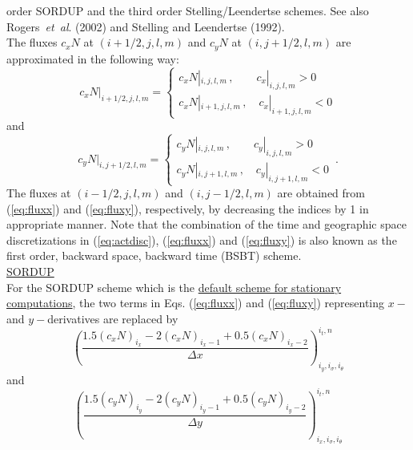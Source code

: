 \documentclass[12pt]{book}
\begin{document}
order SORDUP and the third order Stelling/Leendertse schemes.
See also Rogers~{\it et~al}. (2002) and Stelling and Leendertse (1992).
\\[2ex]
\noindent
The fluxes $c_x N$ at $(i+1/2,j,l,m)$ and $c_y N$ at $(i,j+1/2,l,m)$ are approximated in the
following way:
\begin{equation}
  c_x N|_{i+1/2,j,l,m} = \left\{
                           \begin{array}{l}
                              c_x N|_{i,j,l,m}\,, \qquad c_x|_{i,j,l,m} > 0 \\
                              c_x N|_{i+1,j,l,m}\,, \quad c_x|_{i+1,j,l,m} < 0
                           \end{array}
                         \right.
  \label{eq:fluxx}
\end{equation}
and
\begin{equation}
  c_y N|_{i,j+1/2,l,m} = \left\{
                           \begin{array}{l}
                              c_y N|_{i,j,l,m}\,, \qquad c_y|_{i,j,l,m} > 0 \\
                              c_y N|_{i,j+1,l,m}\,, \quad c_y|_{i,j+1,l,m} < 0
                           \end{array}
                         \right.\, .
  \label{eq:fluxy}
\end{equation}
The fluxes at $(i-1/2,j,l,m)$ and $(i,j-1/2,l,m)$ are obtained from (\ref{eq:fluxx}) and (\ref{eq:fluxy}),
respectively, by decreasing the indices by 1 in appropriate manner. Note that the combination of the time
and geographic space discretizations in (\ref{eq:actdisc}), (\ref{eq:fluxx}) and (\ref{eq:fluxy}) is also
known as the first order, backward space, backward time (BSBT) scheme.
\\[2ex]
\noindent
\underline {SORDUP}
\\[2ex]
\noindent
For the SORDUP scheme which is the \underline{default scheme for stationary computations}, the two terms in
Eqs. (\ref{eq:fluxx}) and (\ref{eq:fluxy}) representing $x-$ and $y-$derivatives are replaced by
\begin{equation}
  \left( \frac{1.5 (c_x N)_{i_x} - 2 (c_x N)_{i_x-1} + 0.5 (c_x N)_{i_x-2}}{\Delta x} \right)^{i_t,n}_{i_y, i_{\sigma}, i_{\theta}}
\end{equation}
and
\begin{equation}
  \left( \frac{1.5 (c_y N)_{i_y} - 2 (c_y N)_{i_y-1} + 0.5 (c_y N)_{i_y-2}}{\Delta y} \right)^{i_t,n}_{i_x, i_{\sigma}, i_{\theta}}
\end{equation}
\end{document}

